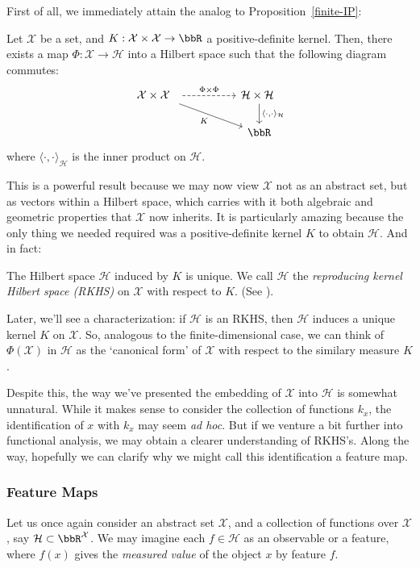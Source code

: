 \documentclass[twoside,11pt]{homework}
\begin{document}
First of all, we immediately attain the analog to Proposition~\ref{finite-IP}:

\begin{proposition}
  Let $\mathcal{X}$ be a set, and $K: \mathcal{X} \times \mathcal{X} \to \bbR$ a positive-definite kernel. Then, there exists a map $\Phi: \mathcal{X} \to \mathcal{H}$ into a Hilbert space such that the following diagram commutes:
    \[\begin{tikzcd}
\mathcal{X} \times \mathcal{X}\ \  \arrow[dashed, rr, "\Phi \times \Phi"] \arrow[drr, "K"'] & & \mathcal{H}\times \mathcal{H} \ \arrow[d, "{\langle\cdot,\cdot \rangle_\mathcal{H}}"] \\
& & \bbR
\end{tikzcd}
    \]
    where $\langle \cdot, \cdot\rangle_\mathcal{H}$ is the inner product on $\mathcal{H}$.
\end{proposition}
This is a powerful result because we may now view $\mathcal{X}$ not as an abstract set, but as vectors within a Hilbert space, which carries with it both algebraic and geometric properties that $\mathcal{X}$ now inherits. It is particularly amazing because the only thing we needed required was a positive-definite kernel $K$ to obtain $\mathcal{H}$. And in fact:
\begin{fact}
  The Hilbert space $\mathcal{H}$ induced by $K$ is unique. We call $\mathcal{H}$ the \emph{reproducing kernel Hilbert space (RKHS)} on $\mathcal{X}$ with respect to $K$. (See \cite[Prop 3.3]{P2009}).
\end{fact}

Later, we'll see a characterization: if $\mathcal{H}$ is an RKHS, then $\mathcal{H}$ induces a unique kernel $K$ on $\mathcal{X}$. So, analogous to the finite-dimensional case, we can think of $\Phi(\mathcal{X})$ in $\mathcal{H}$ as the `canonical form' of $\mathcal{X}$ with respect to the similary measure $K$.



Despite this, the way we've presented the embedding of $\mathcal{X}$ into $\mathcal{H}$ is somewhat unnatural. While it makes sense to consider the collection of functions $k_x$, the identification of $x$ with $k_x$ may seem \emph{ad hoc}. But if we venture a bit further into functional analysis, we may obtain a clearer understanding of RKHS's. Along the way, hopefully we can clarify why we might call this identification a feature map.

\subsubsection{Feature Maps}
Let us once again consider an abstract set $\mathcal{X}$, and a collection of functions over $\mathcal{X}$, say $\mathcal{H} \subset \bbR^\mathcal{X}$. We may imagine each $f \in \mathcal{H}$ as an observable or a feature, where $f(x)$ gives the \emph{measured value} of the object $x$ by feature $f$.
\end{document}
